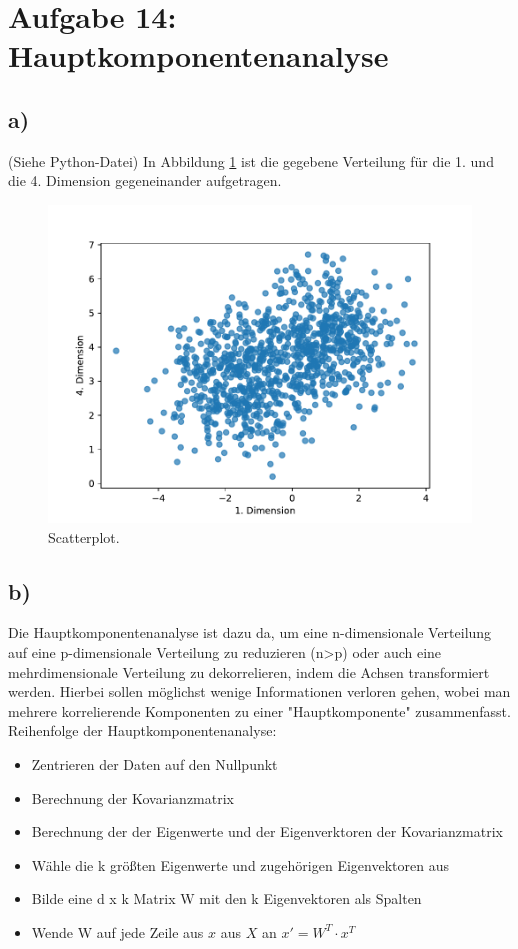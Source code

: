 \section{Aufgabe 14: Hauptkomponentenanalyse}
\subsection{a)}
(Siehe Python-Datei) In Abbildung \ref{abb:1} ist die gegebene Verteilung
für die 1. und die 4. Dimension gegeneinander aufgetragen.
\begin{figure}
  \centering
  \includegraphics[scale=0.7]{Scatterplot.pdf}
  \caption{Scatterplot.}
  \label{abb:1}
\end{figure}


\subsection{b)}
Die Hauptkomponentenanalyse ist dazu da, um eine n-dimensionale Verteilung
auf eine p-dimensionale Verteilung zu reduzieren (n>p) oder auch eine mehrdimensionale
Verteilung zu dekorrelieren, indem die Achsen transformiert werden. Hierbei sollen
möglichst wenige Informationen verloren gehen, wobei man mehrere korrelierende
Komponenten zu einer "Hauptkomponente" zusammenfasst.
Reihenfolge der Hauptkomponentenanalyse:
\begin{itemize}
  \item Zentrieren der Daten auf den Nullpunkt
  \item Berechnung der Kovarianzmatrix
  \item Berechnung der der Eigenwerte und der Eigenverktoren der Kovarianzmatrix
  \item Wähle die k größten Eigenwerte und zugehörigen Eigenvektoren aus
  \item Bilde eine d x k Matrix W mit den k Eigenvektoren als Spalten
  \item Wende W auf jede Zeile aus $x$ aus $X$ an $x' = W^T \cdot x^T$
\end{itemize}

